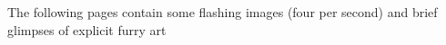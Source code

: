 The following pages contain some flashing images (four per second) and brief glimpses of explicit furry art
